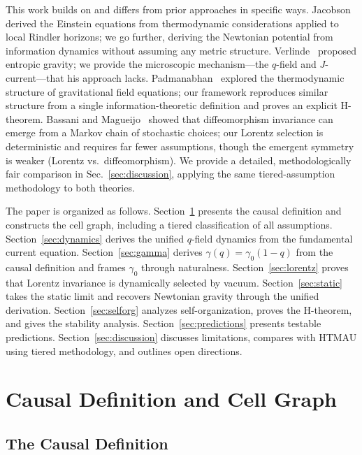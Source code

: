\documentclass[aps,prd,twocolumn,showpacs,superscriptaddress,preprintnumbers]{revtex4-2}
\begin{document}
This work builds on and differs from prior approaches in specific ways.
Jacobson~\cite{Jacobson:1995ab} derived the Einstein equations from thermodynamic considerations applied to local Rindler horizons; we go further, deriving the Newtonian potential from information dynamics without assuming any metric structure.
Verlinde~\cite{Verlinde:2010hp} proposed entropic gravity; we provide the microscopic mechanism---the $q$-field and $J$-current---that his approach lacks.
Padmanabhan~\cite{Padmanabhan:2010} explored the thermodynamic structure of gravitational field equations; our framework reproduces similar structure from a single information-theoretic definition and proves an explicit H-theorem.
Bassani and Magueijo~\cite{Bassani:2025htma} showed that diffeomorphism invariance can emerge from a Markov chain of stochastic choices; our Lorentz selection is deterministic and requires far fewer assumptions, though the emergent symmetry is weaker (Lorentz vs.\ diffeomorphism).
We provide a detailed, methodologically fair comparison in Sec.~\ref{sec:discussion}, applying the same tiered-assumption methodology to both theories.

The paper is organized as follows.
Section~\ref{sec:axioms} presents the causal definition and constructs the cell graph, including a tiered classification of all assumptions.
Section~\ref{sec:dynamics} derives the unified $q$-field dynamics from the fundamental current equation.
Section~\ref{sec:gamma} derives $\gamma(q)=\gamma_0(1-q)$ from the causal definition and frames $\gamma_0$ through naturalness.
Section~\ref{sec:lorentz} proves that Lorentz invariance is dynamically selected by vacuum.
Section~\ref{sec:static} takes the static limit and recovers Newtonian gravity through the unified derivation.
Section~\ref{sec:selforg} analyzes self-organization, proves the H-theorem, and gives the stability analysis.
Section~\ref{sec:predictions} presents testable predictions.
Section~\ref{sec:discussion} discusses limitations, compares with HTMAU using tiered methodology, and outlines open directions.

\section{Causal Definition and Cell Graph}
\label{sec:axioms}

\subsection{The Causal Definition}
\label{sec:causal_def}
\end{document}
